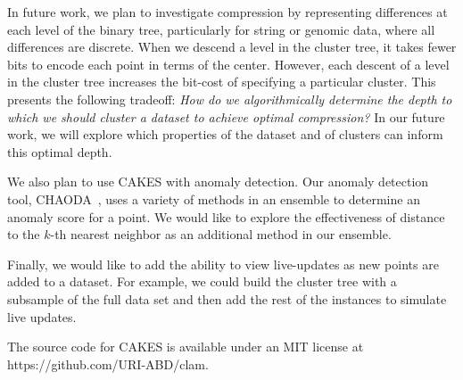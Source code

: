 In future work, we plan to investigate compression by representing differences at each level of the
binary tree, particularly for string or genomic data, where all differences are discrete.
When we descend a level in the cluster tree, it takes fewer bits to encode each point in terms of the center. 
However, each descent of a level in the cluster tree increases the bit-cost of specifying a particular cluster. 
This presents the following tradeoff: \emph{How do we algorithmically determine the depth to which we should cluster a dataset to achieve optimal compression?} 
In our future work, we will explore which properties of the dataset and of clusters can inform this optimal depth. 


We also plan to use CAKES with anomaly detection. Our anomaly detection tool, CHAODA~\cite{ishaq2021clustered}, uses 
a variety of methods in an ensemble to determine an anomaly score for a point. We would like to explore the effectiveness of 
distance to the $k$-th nearest neighbor as an additional method in our ensemble.

Finally, we would like to add the ability to view live-updates as new points are added to a dataset. For example, 
we could build the cluster tree with a subsample of the full data set and then add the rest of the instances to 
simulate live updates.

The source code for CAKES is available under an MIT
license at https://github.com/URI-ABD/clam.

